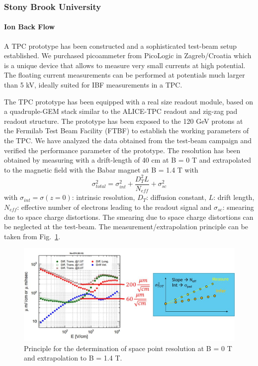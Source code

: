 \subsubsection{Stony Brook University}  
\paragraph{Ion Back Flow} A TPC prototype has been constructed and a sophisticated test-beam setup established. We purchased picoammeter from PicoLogic in Zagreb/Croatia which is a unique device that allows to measure very small currents at high potential. The floating current measurements can be performed at potentials much larger than 5 kV, ideally suited for IBF measurements in a TPC.

The TPC prototype has been equipped with a real size readout module, based on a quadruple-GEM stack similar to the ALICE-TPC readout and zig-zag pad readout structure. The prototype has been exposed to the 120 GeV protons at the Fermilab Test Beam Facility (FTBF) to establish the working parameters of the TPC. We have analyzed the data obtained from the test-beam campaign and verified the performance parameter of the prototype. The resolution has been obtained by measuring with a drift-length of 40 cm at B = 0 T and extrapolated to the magnetic field with the Babar magnet at B = 1.4 T with \[\sigma^2_{total}=\sigma^2_{int}+\frac{D^2_TL}{N_{eff}}+\sigma^2_{sc}\]
with $\sigma_{int}=\sigma(z=0)$: intrinsic resolution, $D_T$: diffusion constant, $L$: drift length, $N_{eff}$: effective number of electrons leading to the readout signal and $\sigma_{sc}$: smearing due to space charge distortions. The smearing due to space charge distortions can be neglected at the test-beam. The measurement/extrapolation principle can be taken from Fig.~\ref{fig:measPrinc}.
\begin{figure}
    \centering
    \includegraphics[width=\columnwidth]{SBU_plots/TPCresolutionPrinciple.jpg}
    \caption{\label{fig:measPrinc}Principle for the determination of space point resolution at B = 0 T and extrapolation to B = 1.4 T.}
\end{figure}

